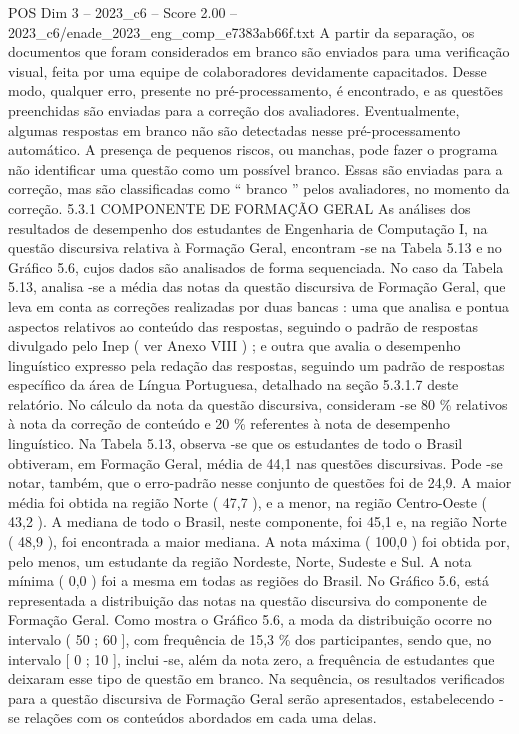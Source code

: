 \begin{textsample}{POS Dim 3 – 2023\_c6 – Score 2.00 – 2023\_c6/enade\_2023\_eng\_comp\_e7383ab66f.txt}
A partir da separação, os documentos que foram considerados em branco são enviados para uma verificação visual, feita por uma equipe de colaboradores devidamente capacitados.
Desse modo, qualquer erro, presente no pré-processamento, é encontrado, e as questões preenchidas são enviadas para a correção dos avaliadores.
Eventualmente, algumas respostas em branco não são detectadas nesse pré-processamento automático.
A presença de pequenos riscos, ou manchas, pode fazer o programa não identificar uma questão como um possível branco.
Essas são enviadas para a correção, mas são classificadas como “ branco ” pelos avaliadores, no momento da correção. 5.3.1 COMPONENTE DE FORMAÇÃO GERAL As análises dos resultados de desempenho dos estudantes de Engenharia de Computação I, na questão discursiva relativa à Formação Geral, encontram -se na Tabela 5.13 e no Gráfico 5.6, cujos dados são analisados de forma sequenciada.
No caso da Tabela 5.13, analisa -se a média das notas da questão discursiva de Formação Geral, que leva em conta as correções realizadas por duas bancas : uma que analisa e pontua aspectos relativos ao conteúdo das respostas, seguindo o padrão de respostas divulgado pelo Inep ( ver Anexo VIII ) ; e outra que avalia o desempenho linguístico expresso pela redação das respostas, seguindo um padrão de respostas específico da área de Língua Portuguesa, detalhado na seção 5.3.1.7 deste relatório.
No cálculo da nota da questão discursiva, consideram -se 80 \% relativos à nota da correção de conteúdo e 20 \% referentes à nota de desempenho linguístico.
Na Tabela 5.13, observa -se que os estudantes de todo o Brasil obtiveram, em Formação Geral, média de 44,1 nas questões discursivas.
Pode -se notar, também, que o erro-padrão nesse conjunto de questões foi de 24,9.
A maior média foi obtida na região Norte ( 47,7 ), e a menor, na região Centro-Oeste ( 43,2 ).
A mediana de todo o Brasil, neste componente, foi 45,1 e, na região Norte ( 48,9 ), foi encontrada a maior mediana.
A nota máxima ( 100,0 ) foi obtida por, pelo menos, um estudante da região Nordeste, Norte, Sudeste e Sul.
A nota mínima ( 0,0 ) foi a mesma em todas as regiões do Brasil.
No Gráfico 5.6, está representada a distribuição das notas na questão discursiva do componente de Formação Geral.
Como mostra o Gráfico 5.6, a moda da distribuição ocorre no intervalo ( 50 ; 60 ], com frequência de 15,3 \% dos participantes, sendo que, no intervalo [ 0 ; 10 ], inclui -se, além da nota zero, a frequência de estudantes que deixaram esse tipo de questão em branco.
Na sequência, os resultados verificados para a questão discursiva de Formação Geral serão apresentados, estabelecendo -se relações com os conteúdos abordados em cada uma delas.

\end{textsample}
